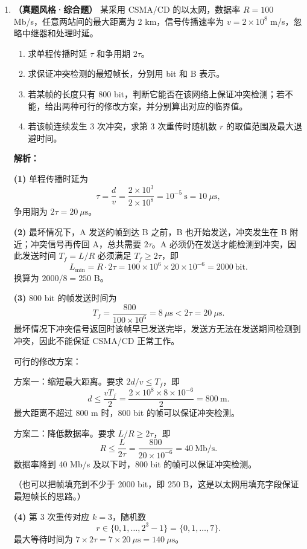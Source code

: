 \begin{enumerate}
\item \textbf{（真题风格·综合题）} 某采用 CSMA/CD 的以太网，数据率 $R=100$ Mb/s，任意两站间的最大距离为 2 km，信号传播速率为 $v=2\times10^{8}$ m/s，忽略中继器和处理时延。

\begin{enumerate}
\item[(1)] 求单程传播时延 $\tau$ 和争用期 $2\tau$。
\item[(2)] 求保证冲突检测的最短帧长，分别用 bit 和 B 表示。
\item[(3)] 若某帧的长度只有 800 bit，判断它能否在该网络上保证冲突检测；若不能，给出两种可行的修改方案，并分别算出对应的临界值。
\item[(4)] 若该帧连续发生 3 次冲突，求第 3 次重传时随机数 $r$ 的取值范围及最大退避时间。
\end{enumerate}

\ifshowsolutions\par\noindent\textbf{解析：}

\textbf{(1)} 单程传播时延为
\[
\tau=\frac{d}{v}=\frac{2\times10^{3}}{2\times10^{8}}=10^{-5}\ \text{s}=10\ \mu\text{s},
\]
争用期为 $2\tau=20\ \mu\text{s}$。

\textbf{(2)} 最坏情况下，A 发送的帧到达 B 之前，B 也开始发送，冲突发生在 B 附近；冲突信号再传回 A，总共需要 $2\tau$。A 必须仍在发送才能检测到冲突，因此发送时间 $T_f=L/R$ 必须满足 $T_f\geqslant2\tau$，即
\[
L_{\min}=R\cdot2\tau=100\times10^{6}\times20\times10^{-6}=2000\ \text{bit}.
\]
换算为 $2000/8=250$ B。

\textbf{(3)} 800 bit 的帧发送时间为
\[
T_f=\frac{800}{100\times10^{6}}=8\ \mu\text{s}<2\tau=20\ \mu\text{s}.
\]
最坏情况下冲突信号返回时该帧早已发送完毕，发送方无法在发送期间检测到冲突，因此不能保证 CSMA/CD 正常工作。

可行的修改方案：

方案一：缩短最大距离。要求 $2d/v\leqslant T_f$，即
\[
d\leqslant\frac{vT_f}{2}=\frac{2\times10^{8}\times8\times10^{-6}}{2}=800\ \text{m}.
\]
最大距离不超过 800 m 时，800 bit 的帧可以保证冲突检测。

方案二：降低数据率。要求 $L/R\geqslant2\tau$，即
\[
R\leqslant\frac{L}{2\tau}=\frac{800}{20\times10^{-6}}=40\ \text{Mb/s}.
\]
数据率降到 40 Mb/s 及以下时，800 bit 的帧可以保证冲突检测。

（也可以把帧填充到不少于 2000 bit，即 250 B，这是以太网用填充字段保证最短帧长的思路。）

\textbf{(4)} 第 3 次重传对应 $k=3$，随机数
\[
r\in\{0,1,\dots,2^{3}-1\}=\{0,1,\dots,7\}.
\]
最大等待时间为 $7\times2\tau=7\times20\ \mu\text{s}=140\ \mu\text{s}$。


\end{enumerate}
